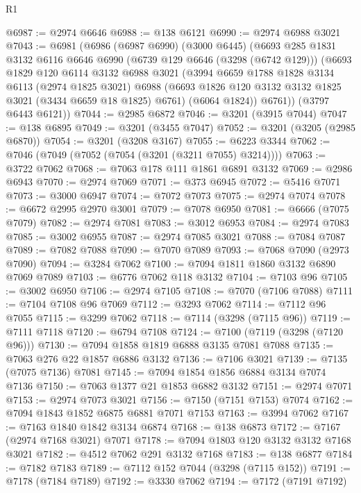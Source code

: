 \begin{lexlean}{R1}
\begin{coremodule}
@6987 := @2974 @6646
@6988 := @138 @6121
@6990 := @2974 @6988 @3021
@7043 := @6981
    (@6986
      (@6987 @6990)
      (@3000 @6445)
      (@6693
        @285
        @1831
        @3132
        @6116
        @6646
        @6990
        (@6739 @129 @6646 (@3298 (@6742 @129)))
        (@6693
          @1829
          @120
          @6114
          @3132
          @6988
          @3021
          (@3994
            @6659
            @1788
            @1828
            @3134
            @6113
            (@2974 @1825 @3021)
            @6988
            (@6693 @1826 @120 @3132 @3132 @1825 @3021 (@3434 @6659 @18 @1825) @6761)
            (@6064 @1824))
          @6761))
      (@3797 @6443 @6121))
@7044 := @2985 @6872
@7046 := @3201 (@3915 @7044)
@7047 := @138 @6895
@7049 := @3201 (@3455 @7047)
@7052 := @3201 (@3205 (@2985 @6870))
@7054 := @3201 (@3208 @3167)
@7055 := @6223 @3344
@7062 := @7046 (@7049 (@7052 (@7054 (@3201 (@3211 @7055) @3214))))
@7063 := @3722 @7062
@7068 := @7063 @178 @111 @1861 @6891 @3132
@7069 := @2986 @6943
@7070 := @2974 @7069
@7071 := @373 @6945
@7072 := @5416 @7071
@7073 := @3000 @6947
@7074 := @7072 @7073
@7075 := @2974 @7074
@7078 := @6672 @2995 @2970 @3001
@7079 := @7078 @6950
@7081 := @6666 (@7075 @7079)
@7082 := @2974 @7081
@7083 := @3012 @6953
@7084 := @2974 @7083
@7085 := @3002 @6955
@7087 := @2974 @7085 @3021
@7088 := @7084 @7087
@7089 := @7082 @7088
@7090 := @7070 @7089
@7093 := @7068 @7090 (@2973 @7090)
@7094 := @3284 @7062
@7100 := @7094 @1811 @1860 @3132 @6890 @7069 @7089
@7103 := @6776 @7062 @118 @3132
@7104 := @7103 @96
@7105 := @3002 @6950
@7106 := @2974 @7105
@7108 := @7070 (@7106 @7088)
@7111 := @7104 @7108 @96 @7069
@7112 := @3293 @7062
@7114 := @7112 @96 @7055
@7115 := @3299 @7062
@7118 := @7114 (@3298 (@7115 @96))
@7119 := @7111 @7118
@7120 := @6794 @7108
@7124 := @7100 (@7119 (@3298 (@7120 @96)))
@7130 := @7094 @1858 @1819 @6888 @3135 @7081 @7088
@7135 := @7063 @276 @22 @1857 @6886 @3132
@7136 := @7106 @3021
@7139 := @7135 (@7075 @7136) @7081
@7145 := @7094 @1854 @1856 @6884 @3134 @7074 @7136
@7150 := @7063 @1377 @21 @1853 @6882 @3132
@7151 := @2974 @7071
@7153 := @2974 @7073 @3021
@7156 := @7150 (@7151 @7153) @7074
@7162 := @7094 @1843 @1852 @6875 @6881 @7071 @7153
@7163 := @3994 @7062
@7167 := @7163 @1840 @1842 @3134 @6874
@7168 := @138 @6873
@7172 := @7167 (@2974 @7168 @3021) @7071
@7178 := @7094 @1803 @120 @3132 @3132 @7168 @3021
@7182 := @4512 @7062 @291 @3132 @7168
@7183 := @138 @6877
@7184 := @7182 @7183
@7189 := @7112 @152 @7044 (@3298 (@7115 @152))
@7191 := @7178 (@7184 @7189)
@7192 := @3330 @7062
@7194 := @7172 (@7191 @7192)

\end{coremodule}
\end{lexlean}
